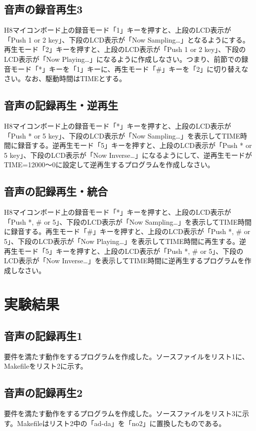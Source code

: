 \documentclass{jarticle}
\begin{document}
\subsection{音声の録音再生3}
H8マイコンボード上の録音モード「1」キーを押すと、上段のLCD表示が「Push 1 or 2 key」、下段のLCD表示が「Now Sampling…」となるようにする。再生モード「2」キーを押すと、上段のLCD表示が「Push 1 or 2 key」、下段のLCD表示が「Now Playing…」になるように作成しなさい。つまり、前節での録音モード「*」キーを「1」キーに、再生モード「#」キーを「2」に切り替えなさい。なお、駆動時間はTIMEとする。

\subsection{音声の記録再生・逆再生}
H8マイコンボード上の録音モード「*」キーを押すと、上段のLCD表示が「Push * or 5 key」、下段のLCD表示が「Now Sampling…」を表示してTIME時間に録音する。逆再生モード「5」キーを押すと、上段のLCD表示が「Push * or 5 key」、下段のLCD表示が「Now Inverse…」になるようにして、逆再生モードがTIME=12000～0に設定して逆再生するプログラムを作成しなさい。

\subsection{音声の記録再生・統合}
H8マイコンボード上の録音モード「*」キーを押すと、上段のLCD表示が「Push *, # or 5」、下段のLCD表示が「Now Sampling…」を表示してTIME時間に録音する。再生モード「#」キーを押すと、上段のLCD表示が「Push *, # or 5」、下段のLCD表示が「Now Playing…」を表示してTIME時間に再生する。逆再生モード「5」キーを押すと、上段のLCD表示が「Push *, # or 5」、下段のLCD表示が「Now Inverse…」を表示してTIME時間に逆再生するプログラムを作成しなさい。

\section{実験結果}

\subsection{音声の記録再生1}
要件を満たす動作をするプログラムを作成した。ソースファイルをリスト1に、Makefileをリスト2に示す。

\subsection{音声の記録再生2}
要件を満たす動作をするプログラムを作成した。ソースファイルをリスト3に示す。Makefileはリスト2中の「ad-da」を「no2」に置換したものである。
\end{document}
